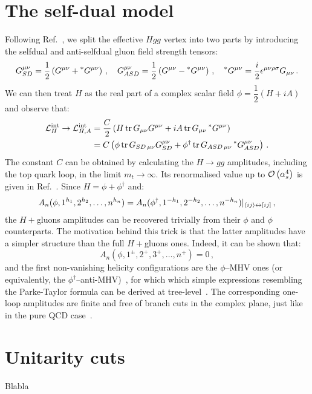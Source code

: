 \documentclass[main.tex]{subfiles}
\begin{document}
\section{The self-dual model}
Following Ref.~\cite{Dixon:2004za}, we split the effective $Hgg$ vertex into two parts by introducing the selfdual and anti-selfdual gluon field strength tensors:
\begin{equation}
    G^{\mu\nu}_{SD} = \frac{1}{2} \left(G^{\mu\nu} + \prescript{\ast}{}{G}^{\mu\nu} \right)\,, \quad     G^{\mu\nu}_{ASD} = \frac{1}{2} \left(G^{\mu\nu} - \prescript{\ast}{}{G}^{\mu\nu} \right)\,, \quad\prescript{\ast}{}{G}^{\mu\nu} = \frac{i}{2} \epsilon^{\mu\nu\rho\sigma} G_{\mu\nu}\,.
\end{equation}
We can then treat $H$ as the real part of a complex scalar field $\phi = \dfrac{1}{2}(H+i A)$ and observe that:
\begin{align}
    \mathcal{L}_H^{\text{int}} \rightarrow \mathcal{L}_{H, A}^{\text{int}} &= \frac{C}{2} \left( H \operatorname{\rm tr} {G}_{\mu\nu}{G}^{\mu\nu} + iA \operatorname{\rm tr} {G}_{\mu\nu}\prescript{\ast}{}{G}^{\mu\nu}\right) \\
    &= C \left( \phi \operatorname{\rm tr} {G}_{SD\,\mu\nu}{G}_{SD}^{\mu\nu} + \phi^\dagger \operatorname{\rm tr} {G}_{ASD\,\mu\nu}\prescript{\ast}{}{G}_{ASD}^{\mu\nu}\right)\,.
\end{align} 
The constant $C$ can be obtained by calculating the $H \rightarrow gg$ amplitudes, including the top quark loop, in the limit $m_t \rightarrow \infty$. Its renormalised value up to $\mathcal{O}\left(\alpha_s^4\right)$ is given in Ref.~\cite{Chetyrkin:1997iv}. Since $H = \phi + \phi^\dagger$ and:
\begin{equation}
    A_n(\phi, 1^{h_1},2^{h_2}, \ldots, n^{h_n}) = A_n(\phi^\dagger, 1^{-h_1},2^{-h_2}, \ldots, n^{-h_n}) \rvert_{\langle ij\rangle \leftrightarrow [ij]} \,,
\end{equation}
the $H+$gluons amplitudes can be recovered trivially from their $\phi$ and $\phi$ counterparts. The motivation behind this trick is that the latter amplitudes have a simpler structure than the full $H+$gluons ones. Indeed, it can be shown that: 
\begin{equation}
    A_n(\phi, 1^\pm,2^+,3^+, \ldots, n^+) = 0 \,,
\end{equation}
and the first non-vanishing helicity configurations are the $\phi$--MHV ones (or equivalently, the $\phi^\dagger$--anti-MHV)~\cite{Berends:1988759}, for which which simple expressions resembling the Parke-Taylor formula can be derived at tree-level~\cite{Dixon:2004za}. The corresponding one-loop amplitudes  are finite and free of branch cuts in the complex plane, just like in the pure QCD case~\cite{Mahlon:1993si}. 

\section{Unitarity cuts}
Blabla
\end{document}
